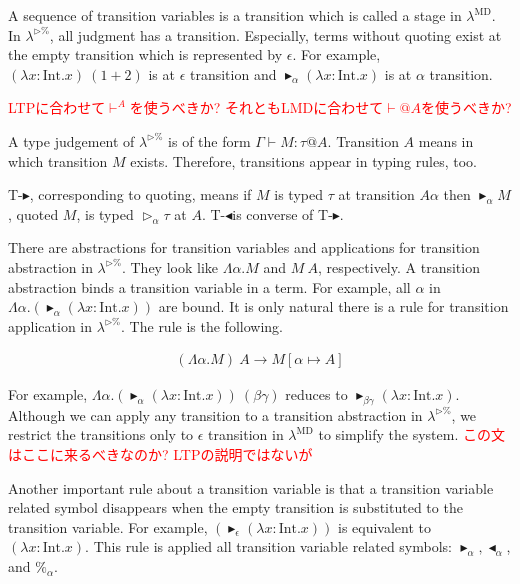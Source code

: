\documentclass[runningheads]{llncs}
\newcommand{\red}[1]{\textcolor{red}{#1 }}
\newcommand{\LTP}{$\lambda^{\triangleright\%}$\xspace}
\newcommand{\LMD}{$\lambda^{\textrm{MD}}$\xspace}
\newcommand{\G}{\Gamma}
\newcommand{\TW}{\triangleright}
\newcommand{\TB}{\blacktriangleright}
\newcommand{\TBL}{\blacktriangleleft}
\newcommand{\TTB}{\textsc{T-$\TB$}}
\newcommand{\TTBL}{\textsc{T-$\TBL$}}
\newcommand{\I}{\textrm{Int}}
\begin{document}

A sequence of transition variables is a transition which is called a stage in \LMD.
In \LTP, all judgment has a transition.
Especially, terms without quoting exist at the empty transition which is represented by $\epsilon$.
For example, $(\lambda x:\I.x)\ (1+2)$ is at $\epsilon$ transition and 
$\TB_\alpha (\lambda x:\I.x)$ is at $\alpha$ transition.


\red{LTPに合わせて$\vdash^A$を使うべきか? それともLMDに合わせて$\vdash @ A$を使うべきか?}

A type judgement of \LTP is of the form $\G \vdash M : \tau @ A$.
Transition $A$ means in which transition $M$ exists.
Therefore, transitions appear in typing rules, too.
\begin{center}
    \infrule{\G\vdash M:\tau @{A\alpha}}{\G\vdash \TB_{\alpha}M:\TW_{\alpha}\tau @A}{\TTB} \andalso
    \infrule{\G\vdash M:\TW_{\alpha}\tau @A}{\G\vdash \TBL_{\alpha}M:\tau @{A\alpha}}{\TTBL}
\end{center}
\TTB, corresponding to quoting, means 
if $M$ is typed $\tau$ at transition $A\alpha$ then $\TB_{\alpha}M$, quoted $M$, is typed $\TW_{\alpha}\tau$ at $A$.
\TTBL is converse of \TTB.


There are abstractions for transition variables and applications for transition abstraction in \LTP.
They look like $\Lambda\alpha.M$ and $M\ A$, respectively.
A transition abstraction binds a transition variable in a term.
For example, all $\alpha$ in $\Lambda\alpha.(\TB_\alpha (\lambda x:\I.x))$ are bound.
It is only natural there is a rule for transition application in \LTP.
The rule is the following.

\begin{align*}
    (\Lambda\alpha.M)\ A \longrightarrow M[\alpha\mapsto A]
\end{align*}

For example, $\Lambda\alpha.(\TB_\alpha (\lambda x:\I.x))\ (\beta\gamma)$ reduces to $\TB_{\beta\gamma} (\lambda x:\I.x)$.
Although we can apply any transition to a transition abstraction in \LTP,
we restrict the transitions only to $\epsilon$ transition in \LMD to simplify the system.
\red{この文はここに来るべきなのか? LTPの説明ではないが}


Another important rule about a transition variable is 
that a transition variable related symbol disappears when the empty transition is substituted to the transition variable.
For example, $(\TB_\epsilon (\lambda x:\I.x))$ is equivalent to $(\lambda x:\I.x)$.
This rule is applied all transition variable related symbols: $\TB_\alpha, \TBL_\alpha$, and $\%_\alpha$.
\end{document}
